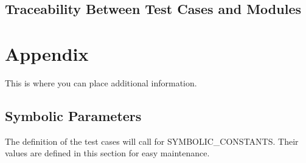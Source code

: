 \documentclass[12pt, titlepage]{article}
\begin{document}
\subsection{Traceability Between Test Cases and Modules}

				




\newpage

\section{Appendix}

This is where you can place additional information.

\subsection{Symbolic Parameters}

The definition of the test cases will call for SYMBOLIC\_CONSTANTS.
Their values are defined in this section for easy maintenance.
\end{document}
